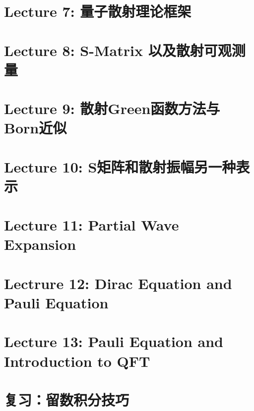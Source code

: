 \documentclass[10pt]{article}
\begin{document}
\newpage
\section{Lecture 7: 量子散射理论框架}\label{sec:Lecture 7: } %


\newpage
\section{Lecture 8: S-Matrix 以及散射可观测量}\label{sec:Lecture 8:} %


\newpage
\section{Lecture 9: 散射Green函数方法与Born近似}\label{sec:Lecture 9: } %


\newpage
\section{Lecture 10: S矩阵和散射振幅另一种表示}\label{sec:Lecture 10: 额外专题} %


\newpage 
\section{Lecture 11: Partial Wave Expansion}\label{sec:Lecture 11:} %


\newpage 
\section{Lectrure 12: Dirac Equation and Pauli Equation}\label{sec:Lectrure 12: Dirac Equation and Pauli Equation} %


\newpage 
\section{Lecture 13: Pauli Equation and Introduction to QFT}\label{sec:Lecture 13: Pauli Equation and Intro to QFT} %


\newpage 
\section{复习：留数积分技巧}\label{sec:复习：留数积分技巧} %

\end{document}
